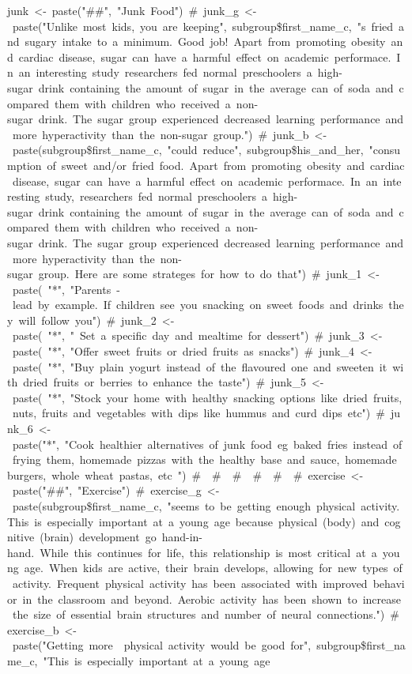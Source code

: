 \documentclass[]{article}
\begin{document}
junk\ \textless{}-\ paste("\#\#",\ "Junk\ Food")\ \#\ junk\_g\ \textless{}-\ paste("Unlike\ most\ kids,\ you\ are\ keeping",\ subgroup\$first\_name\_c,\ "\textquotesingle{}s\ fried\ and\ sugary\ intake\ to\ a\ minimum.\ Good\ job!\ Apart\ from\ promoting\ obesity\ and\ cardiac\ disease,\ sugar\ can\ have\ a\ harmful\ effect\ on\ academic\ performace.\ In\ an\ interesting\ study\ researchers\ fed\ normal\ preschoolers\ a\ high-sugar\ drink\ containing\ the\ amount\ of\ sugar\ in\ the\ average\ can\ of\ soda\ and\ compared\ them\ with\ children\ who\ received\ a\ non-sugar\ drink.\ The\ sugar\ group\ experienced\ decreased\ learning\ performance\ and\ more\ hyperactivity\ than\ the\ non-sugar\ group.")\ \#\ junk\_b\ \textless{}-\ paste(subgroup\$first\_name\_c,\ "could\ reduce",\ subgroup\$his\_and\_her,\ "consumption\ of\ sweet\ and/or\ fried\ food.\ Apart\ from\ promoting\ obesity\ and\ cardiac\ disease,\ sugar\ can\ have\ a\ harmful\ effect\ on\ academic\ performace.\ In\ an\ interesting\ study,\ researchers\ fed\ normal\ preschoolers\ a\ high-sugar\ drink\ containing\ the\ amount\ of\ sugar\ in\ the\ average\ can\ of\ soda\ and\ compared\ them\ with\ children\ who\ received\ a\ non-sugar\ drink.\ The\ sugar\ group\ experienced\ decreased\ learning\ performance\ and\ more\ hyperactivity\ than\ the\ non-sugar\ group.\ Here\ are\ some\ strateges\ for\ how\ to\ do\ that")\ \#\ junk\_1\ \textless{}-\ paste(\ "*",\ "Parents\ -\ lead\ by\ example.\ If\ children\ see\ you\ snacking\ on\ sweet\ foods\ and\ drinks\ they\ will\ follow\ you")\ \#\ junk\_2\ \textless{}-\ paste(\ "*",\ "\ Set\ a\ specific\ day\ and\ mealtime\ for\ dessert")\ \#\ junk\_3\ \textless{}-\ paste(\ "*",\ "Offer\ sweet\ fruits\ or\ dried\ fruits\ as\ snacks")\ \#\ junk\_4\ \textless{}-\ paste(\ "*",\ "Buy\ plain\ yogurt\ instead\ of\ the\ flavoured\ one\ and\ sweeten\ it\ with\ dried\ fruits\ or\ berries\ to\ enhance\ the\ taste")\ \#\ junk\_5\ \textless{}-\ paste(\ "*",\ "Stock\ your\ home\ with\ healthy\ snacking\ options\ like\ dried\ fruits,\ nuts,\ fruits\ and\ vegetables\ with\ dips\ like\ hummus\ and\ curd\ dips\ etc")\ \#\ junk\_6\ \textless{}-\ paste("*",\ "Cook\ healthier\ alternatives\ of\ junk\ food\ eg\ baked\ fries\ instead\ of\ frying\ them,\ homemade\ pizzas\ with\ the\ healthy\ base\ and\ sauce,\ homemade\ burgers,\ whole\ wheat\ pastas,\ etc\ ")\ \#\ \ \#\ \ \#\ \ \#\ \ \#\ \ \#\ exercise\ \textless{}-\ paste("\#\#",\ "Exercise")\ \#\ exercise\_g\ \textless{}-\ paste(subgroup\$first\_name\_c,\ "seems\ to\ be\ getting\ enough\ physical\ activity.\ This\ is\ especially\ important\ at\ a\ young\ age\ because\ physical\ (body)\ and\ cognitive\ (brain)\ development\ go\ hand-in-hand.\ While\ this\ continues\ for\ life,\ this\ relationship\ is\ most\ critical\ at\ a\ young\ age.\ When\ kids\ are\ active,\ their\ brain\ develops,\ allowing\ for\ new\ types\ of\ activity.\ Frequent\ physical\ activity\ has\ been\ associated\ with\ improved\ behavior\ in\ the\ classroom\ and\ beyond.\ Aerobic\ activity\ has\ been\ shown\ to\ increase\ the\ size\ of\ essential\ brain\ structures\ and\ number\ of\ neural\ connections.")\ \#\ exercise\_b\ \textless{}-\ paste("Getting\ more\ \ physical\ activity\ would\ be\ good\ for",\ subgroup\$first\_name\_c,\ "This\ is\ especially\ important\ at\ a\ young\ age\ 
\end{document}
